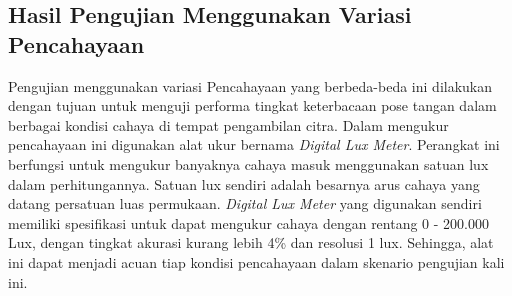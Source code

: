 




\subsection{Hasil Pengujian Menggunakan Variasi Pencahayaan}
\label{subsec:Hasil Pengujian Menggunakan Variasi Pencahayaan}


Pengujian menggunakan variasi Pencahayaan yang berbeda-beda ini dilakukan dengan tujuan untuk menguji performa tingkat keterbacaan pose tangan dalam berbagai kondisi cahaya di tempat pengambilan citra. Dalam mengukur pencahayaan ini digunakan alat ukur bernama \emph{Digital Lux Meter}. Perangkat ini berfungsi untuk mengukur banyaknya cahaya masuk menggunakan satuan lux dalam perhitungannya. Satuan lux sendiri adalah besarnya arus cahaya yang datang persatuan luas permukaan. \emph{Digital Lux Meter} yang digunakan sendiri memiliki spesifikasi untuk dapat mengukur cahaya dengan rentang 0 - 200.000 Lux, dengan tingkat akurasi kurang lebih 4\% dan resolusi 1 lux. Sehingga, alat ini dapat menjadi acuan tiap kondisi pencahayaan dalam skenario pengujian kali ini.

